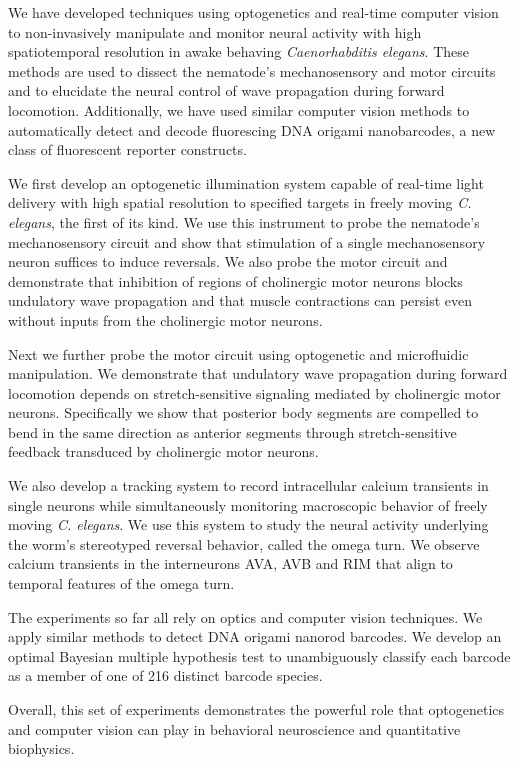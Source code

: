 
We have developed techniques using optogenetics and real-time computer vision to non-invasively manipulate and monitor neural activity with high spatiotemporal resolution in awake behaving \textit{Caenorhabditis elegans}. These methods are used to dissect the nematode's mechanosensory and motor circuits and to elucidate the neural control of wave propagation during forward locomotion.  Additionally, we have used similar computer vision methods to automatically detect and decode fluorescing DNA origami nanobarcodes, a new class of fluorescent reporter constructs.

We first develop an optogenetic illumination system capable of real-time light delivery with high spatial resolution to specified targets in freely moving \textit{C. elegans}, the first of its kind. We use this instrument to probe the nematode's mechanosensory circuit and show that stimulation of a single mechanosensory neuron suffices to induce reversals. We also probe the motor circuit and demonstrate that inhibition of regions of cholinergic motor neurons blocks undulatory wave propagation and that muscle contractions can persist even without inputs from the cholinergic motor neurons.

Next we further probe the motor circuit using optogenetic and microfluidic manipulation. We demonstrate that undulatory wave propagation during forward locomotion depends on stretch-sensitive signaling mediated by cholinergic motor neurons. Specifically we show that posterior body segments are compelled to bend in the same
direction as anterior segments through stretch-sensitive feedback transduced by cholinergic motor neurons.
 
We also develop a tracking system to record intracellular calcium transients in single neurons while simultaneously monitoring macroscopic behavior of freely moving \textit{C. elegans}. We use this system to study the neural activity underlying the worm's stereotyped reversal behavior, called the omega turn. We observe calcium transients in the interneurons AVA, AVB and RIM that align to temporal features of the omega turn.

The experiments so far all rely on optics and computer vision techniques. We apply similar methods to detect DNA origami nanorod barcodes. We develop an optimal Bayesian multiple hypothesis test to unambiguously classify each barcode as a member of one of 216 distinct barcode species.


Overall, this set of experiments demonstrates the powerful role that optogenetics and computer vision can play in behavioral neuroscience and quantitative biophysics.